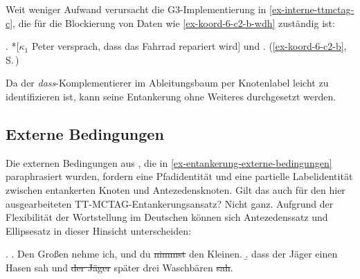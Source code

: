 Weit weniger Aufwand verursacht die G3-Implementierung in \ref{ex-interne-ttmctag-c}, die für die Blockierung von Daten wie \ref{ex-koord-6-c2-b-wdh} zuständig ist: 

\ex. *[$\kappa_1$ Peter versprach, dass das Fahrrad repariert wird] und .\label{ex-koord-6-c2-b-wdh}  \hfill (\ref{ex-koord-6-c2-b}, S.\,\pageref{ex-koord-6-c2-b})

Da der {\it dass}-Komplementierer im Ableitungsbaum per Knotenlabel leicht zu identifizieren ist, kann seine Entankerung ohne Weiteres durchgesetzt werden. 


\subsection{Externe Bedingungen} 
	
Die externen Bedingungen aus \cite{Lichte:Kallmeyer:10}, die in \ref{ex-entankerung-externe-bedingungen} paraphrasiert wurden, fordern eine Pfadidentität und eine partielle Labelidentität zwischen entankerten Knoten und Antezedensknoten. Gilt das auch für den hier ausgearbeiteten TT-MCTAG-Entankerungs\-an\-satz? Nicht ganz. Aufgrund der Flexibilität der Wortstellung im Deutschen können sich Antezedenssatz und Ellipsesatz in dieser Hinsicht unterscheiden: 

\ex. \label{ex-deanchoring-10}
\a. Den Gro\ss en nehme ich, und du \sout{nimmst} den Kleinen. \hfill \citep[262]{Oirsouw:87}
\b. dass der Jäger einen Hasen sah und \sout{der Jäger} später drei Waschbären \sout{sah}.\label{ex-deanchoring-10-b}

